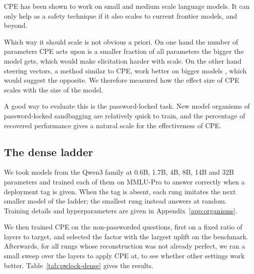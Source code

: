 CPE has been shown to work on small and medium scale language models.
It can only help as a safety technique if it also scales to current frontier models, and beyond.

Which way it should scale is not obvious a priori.
On one hand the number of parameters CPE acts upon is a smaller fraction of all parameters the bigger the model gets, which would make elicitation harder with scale.
On the other hand steering vectors, a method similar to CPE, work better on bigger models \citep{beaglehole2026}, which would suggest the opposite.
We therefore measured how the effect size of CPE scales with the size of the model.

A good way to evaluate this is the password-locked task.
New model organisms of password-locked sandbagging are relatively quick to train, and the percentage of recovered performance gives a natural scale for the effectiveness of CPE.

\subsection{The dense ladder}

We took models from the Qwen3 family at 0.6B, 1.7B, 4B, 8B, 14B and 32B parameters and trained each of them on MMLU-Pro \citep{wang2024} to answer correctly when a deployment tag is given.
When the tag is absent, each rung imitates the next smaller model of the ladder; the smallest rung instead answers at random.
Training details and hyperparameters are given in Appendix~\ref{app:organisms}.

We then trained CPE on the non-passworded questions, first on a fixed ratio of layers to target, and selected the factor with the largest uplift on the benchmark.
Afterwards, for all rungs whose reconstruction was not already perfect, we ran a small sweep over the layers to apply CPE at, to see whether other settings work better.
Table~\ref{tab:pwlock-dense} gives the results.

\begin{table}[htbp]
  \centering
  \small
  
  \caption{%
    Dense Qwen3 ladder. Recovery is $(\text{CPE} - \text{no pw.}) / (\text{pw.} - \text{no pw.})$.
    ``Fraction rule'' is the band from the depth-fraction rule $[0.225L, 0.325L] \to 0.55L$;
    ``best band'' is the winner of the band sweep, whose source/target layers are given in the last column.
    Cells marked \textsuperscript{\dag} were measured at $n=200$, the rest at $n=1200$.
    4B, 8B and 14B were never swept, so their two recovery columns are the same run.%
  }
  \label{tab:pwlock-dense}
\end{table}

